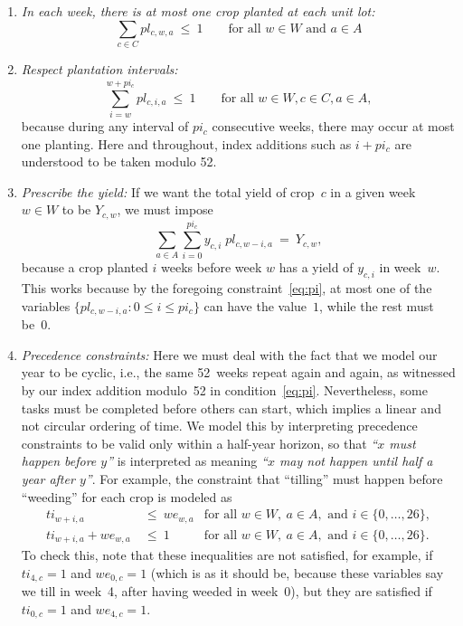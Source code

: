\documentclass[11pt]{amsart}
\numberwithin{equation}{section}
\begin{document}
\begin{enumerate}
\item \emph{In each week, there is at most one crop planted at each unit lot:}
\[
   \sum_{c\in C} pl_{c,w,a} \ \le \ 1
   \qquad\text{for all } w\in W \text{ and } a\in A
\]

\item\emph{Respect plantation intervals:}
\begin{equation}\label{eq:pi}
   \sum_{i=w}^{w+pi_c} pl_{c,i,a} \ \le \ 1
   \qquad\text{for all } w\in W, c\in C, a\in A,
\end{equation}
because during any interval of $pi_c$ consecutive weeks, there may
occur at most one planting.  Here and throughout, index additions such
as $i+pi_c$ are understood to be taken modulo 52.

\smallskip
\item\emph{Prescribe the yield:} If we want the total yield of crop~$c$ in
  a given week~$w\in W$ to be $Y_{c,w}$, we must impose
\[
    \sum_{a\in A} \sum_{i=0}^{pi_c} y_{c,i}\; pl_{c,w-i,a}
    \ = \
    Y_{c,w},
\]
because a crop planted $i$ weeks before week $w$ has a yield of
$y_{c,i}$ in week~$w$.  This works because by the foregoing
constraint~\eqref{eq:pi}, at most one of the variables
$\{pl_{c,w-i,a}:0\le i\le pi_c\}$ can have the value~$1$, while the rest must
be~$0$.

\smallskip
\item\emph{Precedence constraints:} Here we must deal with the fact
  that we model our year to be cyclic, i.e., the same 52~weeks repeat
  again and again, as witnessed by our index addition modulo~52 in
  condition~\eqref{eq:pi}. Nevertheless, some tasks must be completed
  before others can start, which implies a linear and not circular
  ordering of time. We model this by interpreting precedence
  constraints to be valid only within a half-year horizon, so
  that \emph{``$x$ must happen before $y$''} is interpreted as meaning
  \emph{``$x$ may not happen until half a year after $y$''}.
  For example, the constraint that ``tilling'' must happen before ``weeding''
  for each crop is modeled as
  \begin{align*}
     \textstyle ti_{w+i,a} & \ \le \  we_{w,a} &
     \text{for all } w\in W,\ a\in A, \text{ and }
     i\in\{0,\dots,26\},\\
     \textstyle ti_{w+i,a} + we_{w,a} & \ \le\   1 &
     \text{for all } w\in W,\ a\in A, \text{ and }
     i\in\{0,\dots,26\}.
  \end{align*}
  To check this, note that these inequalities are not satisfied, for
  example, if $ti_{4,c}=1$ and $we_{0,c}=1$ (which is as it should be,
  because these variables say we till in week~4, after having weeded
  in week~0), but they are satisfied if $ti_{0,c}=1$ and $we_{4,c}=1$.

\end{enumerate}
\end{document}
